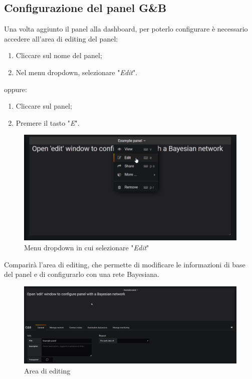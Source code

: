 \subsection{Configurazione del panel G\&B}
Una volta aggiunto il panel alla dashboard, per poterlo configurare è necessario accedere all'area di editing del panel:
\begin{enumerate}
	\item Cliccare sul nome del panel;
	\item Nel menu dropdown, selezionare "\textit{Edit}".
\end{enumerate}
oppure:
\begin{enumerate}
	\item Cliccare sul panel;
	\item Premere il tasto "\textit{E}".
\end{enumerate}
\begin{figure} [H]
	\centering
	\includegraphics[scale=0.55]{Img/editmode} 
	\caption{Menu dropdown in cui selezionare "\textit{Edit}"} \label{} 
\end{figure} 
Comparirà l'area di editing, che permette di modificare le informazioni di base del panel e di configurarlo con una rete Bayesiana.
\begin{figure} [H]
	\centering
	\includegraphics[scale=0.4]{Img/editview} 
	\caption{Area di editing} \label{} 
\end{figure} 
